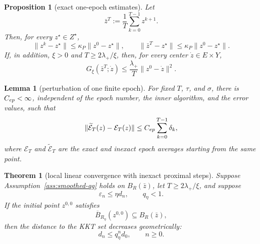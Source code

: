 \documentclass[10pt,a4paper]{amsart}
\newtheorem{theorem}{Theorem}
\newtheorem{proposition}{Proposition}
\newtheorem{lemma}{Lemma}
\begin{document}
\begin{proposition}[exact one-epoch estimates]
\label{prop:one-epoch-estimates}
Let
\[
    \bar z^T
    :=
    \frac1T\sum_{k=0}^{T-1}z^{k+1}.
\]
Then, for every $z^\star\in Z^\star$,
\begin{equation}
\label{eq:average-boundedness}
    \|z^k-z^\star\|
    \le
    \kappa_P\|z^0-z^\star\|,
    \qquad
    \|\bar z^T-z^\star\|
    \le
    \kappa_P\|z^0-z^\star\|.
\end{equation}
If, in addition, $\xi>0$ and $T\ge2\lambda_+/\xi$, then, for every center
$\dot z\in E\times Y$,
\begin{equation}
\label{eq:smoothed-gap-rate}
    G_\xi(\bar z^T;\dot z)
    \le
    \frac{\lambda_+}{T}\|z^0-\dot z\|^2.
\end{equation}
\end{proposition}

\begin{lemma}[perturbation of one finite epoch]
\label{lem:theory-epoch-perturbation}
For fixed $T$, $\tau$, and $\sigma$, there is
$C_{\rm ep}<\infty$, independent of the epoch number, the inner algorithm,
and the error values, such that
\begin{equation}
\label{eq:theory-epoch-perturbation}
    \|\widetilde{\mathcal E}_T(z)-\mathcal E_T(z)\|
    \le
    C_{\rm ep}\sum_{k=0}^{T-1}\delta_k,
\end{equation}
where $\mathcal E_T$ and $\widetilde{\mathcal E}_T$ are the exact and inexact
epoch averages starting from the same point.
\end{lemma}

\begin{theorem}[local linear convergence with inexact proximal steps]
\label{thm:inexact-local-linear}
Suppose Assumption~\ref{ass:smoothed-qg} holds on $B_R(\bar z)$, let
$T\ge2\lambda_+/\xi$, and suppose
\begin{equation}
\label{eq:general-relative-error}
    \varepsilon_n\le\eta d_n,
    \qquad
    q_\eta<1.
\end{equation}
\label{eq:rh-relative-epoch-error}
If the initial point $z^{0,0}$ satisfies
\begin{equation}
\label{eq:inexact-retention-ball}
    \overline B_{R_\eta}(z^{0,0})
    \subseteq
    B_R(\bar z),
\end{equation}
then the distance to the KKT set decreases geometrically:
\begin{equation}
\label{eq:general-relative-rate}
    d_n\le q_\eta^n d_0,
    \qquad n\ge0.
\end{equation}
\end{theorem}
\end{document}
